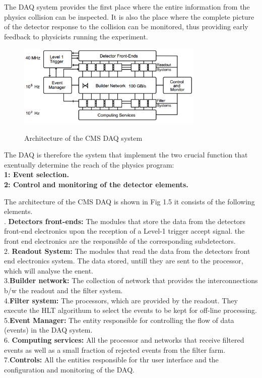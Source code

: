 The DAQ system provides the first place where the entire information from the physics collision can be inspected. It is also the place where the complete picture of the detector response to the collision can be monitored, thus providing early feedback to physicists running the experiment. 
    \begin{figure}[h]
    \begin{center}
    \includegraphics[width=3.5in]{pic/CERN_CMS_DAQ} \\
    \caption{Architecture of the CMS DAQ system}
    \end{center}
    \end{figure}
The DAQ is therefore the system that implement the two crucial function that exentually determine the reach of the physics program:\\
\smallskip
{\bf 1: Event selection.}\\
{\bf 2: Control and monitoring of the detector elements.}

The architecture of the CMS DAQ is shown in Fig 1.5 it consists of the following elements.\\
. {\bf Detectors front-ends:} The modules that store the data from the detectors front-end electronics upon the reception of a Level-1 trigger accept signal. the front end electronics are the responsible of the corresponding subdetectors. \\
2. {\bf Readout System:} The modules that read the data from the detectors front end electronics system. The data stored, untill they are sent to the processor, which will analyse the enent.\\
3.{\bf Builder network:} The collection of network that provides the interconnections b/w the readout and the filter system.\\
4.{\bf Filter system:} The processors, which are provided by the readout. They execute the HLT algorithum to select the events to be kept for off-line processing.\\
5.{\bf Event Manager:} The entity responsible for controlling the flow of data (events) in the DAQ system.\\
6. {\bf Computing services:} All the processor and networks that receive filtered events as well as a small fraction of rejected events from the filter farm.\\
7.{\bf Controls:} All the entities responsible for thr user interface and the configuration and monitoring of the DAQ.




